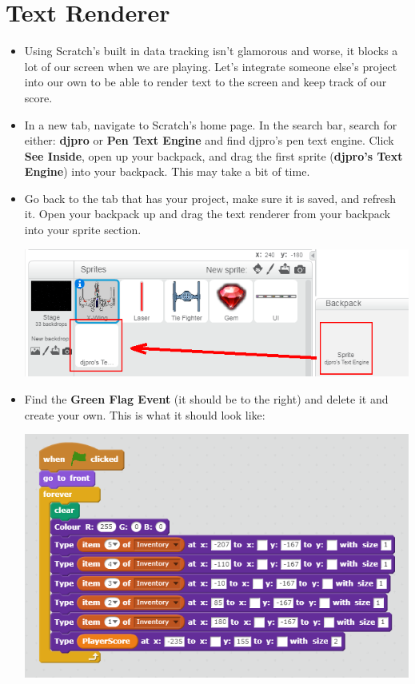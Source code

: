 \documentclass[12pt]{article}
\begin{document}
\section *{Text Renderer}
	\begin{itemize}
		\item Using Scratch's built in data tracking isn't glamorous and worse, it blocks a lot of our screen when we are playing. Let's integrate someone else's project into our own to be able to render text to the screen and keep track of our score. \\

		\item In a new tab, navigate to Scratch's home page. In the search bar, search for either: \textbf{djpro} or \textbf{Pen Text Engine} and find djpro's pen text engine. Click \textbf{See Inside}, open up your backpack, and drag the first sprite (\textbf{djpro's Text Engine}) into your backpack. This may take a bit of time.\\

		\item Go back to the tab that has your project, make sure it is saved, and refresh it. Open your backpack up and drag the text renderer from your backpack into your sprite section.

		\begin{center}
    		\includegraphics[scale = 0.6]{./Images/djpro.png}
		\end{center}
		\newpage
		\item Find the \textbf{Green Flag Event} (it should be to the right) and delete it and create your own. This is what it should look like:

		\begin{center}
    		\includegraphics[scale = 0.6]{./Images/TextRenderer_GreenFlag.png}
		\end{center}
	\end{itemize}
\end{document}
